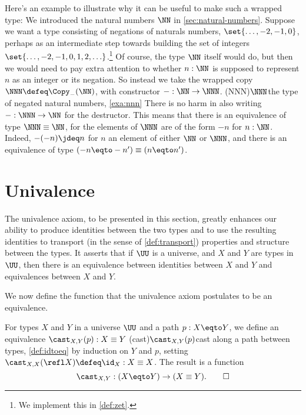 \begin{example}\label{exa:nnn}
Here's an example to illustrate why it can be useful to make such a wrapped type:
We introduced the natural numbers $\NN$ in \cref{sec:natural-numbers}.
Suppose we want a type consisting of negations of naturals numbers,
$\set{\ldots, -2, -1,0}$,
perhaps as an intermediate step towards building the set of integers
$\set{\ldots, -2, -1,0,1,2,\ldots}$.\footnote{%
  We implement this in \cref{def:zet}.}
Of course, the type $\NN$ itself would do,
but then we would need to pay extra attention to whether $n:\NN$
is supposed to represent $n$ as an integer or its negation.
So instead we take the wrapped copy $\NNN\defeq\Copy_{-}(\NN)$,
with constructor ${-} : \NN \to \NNN$.%
\glossary(NNN){$\protect\NNN$}{the type of negated natural numbers,
  \cref{exa:nnn}}
There is no harm in also writing ${-} : \NNN \to \NN$
for the destructor.
This means that there is an equivalence of type $\NNN \equiv \NN$, for
the elements of $\NNN$ are of the form $-n$ for $n:\NN$.
Indeed, $-(-n) \jdeq n$ for $n$ an element of either $\NN$ or $\NNN$,
and there is an equivalence of type $(-n \eqto -n') \equiv (n \eqto n')$.
\end{example}

\section{Univalence}\label{sec:univax}

The univalence axiom, to be presented in this section, greatly enhances our ability to produce identities between the two types and to use the
resulting identities to transport (in the sense of \cref{def:transport}) properties and structure between the types.  It asserts that if $\UU$
is a universe, and $X$ and $Y$ are types in $\UU$, then there is an equivalence between identities between $X$ and $Y$ and equivalences between
$X$ and $Y$.

We now define the function that the univalence axiom postulates to be an equivalence.

\begin{definition}\label{def:idtoeq}
  For types $X$ and $Y$ in a universe $\UU$ and a path $p : X \eqto Y$,
  we define an equivalence $\cast_{X,Y} (p) : X\equiv Y$
  \glossary(cast){$\protect\cast_{X,Y} (p)$}{cast along a path between types, \cref{def:idtoeq}}
  by induction on $Y$ and $p$,
  setting $\cast_{X,X} (\refl X) \defeq \id_X : X \equiv X$.
  The result is a function
  \[
    \cast_{X,Y} : (X \eqto Y) \to (X\equiv Y).\qedhere
  \]
\end{definition}

